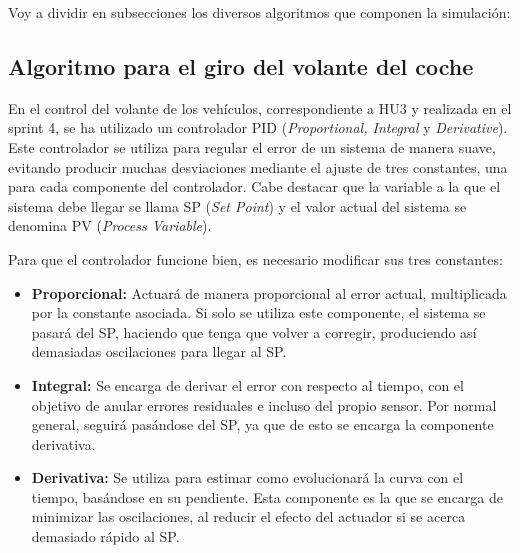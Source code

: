 Voy a dividir en subsecciones los diversos algoritmos que componen la simulación:

\subsection{Algoritmo para el giro del volante del coche}

En el control del volante de los vehículos, correspondiente a HU3 y realizada en el sprint 4, se ha utilizado un controlador PID (\textit{Proportional, Integral} y \textit{Derivative}). Este controlador se utiliza para regular el error de un sistema de manera suave, evitando producir muchas desviaciones mediante el ajuste de tres constantes, una para cada componente del controlador. Cabe destacar que la variable a la que el sistema debe llegar se llama SP (\textit{Set Point}) y el valor actual del sistema se denomina PV (\textit{Process Variable}). 

\bigskip

Para que el controlador funcione bien, es necesario modificar sus tres constantes: 

\begin{itemize}
    \item \textbf{Proporcional: }Actuará de manera proporcional al error actual, multiplicada por la constante asociada. Si solo se utiliza este componente, el sistema se pasará del SP, haciendo que tenga que volver a corregir, produciendo así demasiadas oscilaciones para llegar al SP. 

    \item \textbf{Integral: }Se encarga de derivar el error con respecto al tiempo, con el objetivo de anular errores residuales e incluso del propio sensor. Por normal general, seguirá pasándose del SP, ya que de esto se encarga la componente derivativa.

    \item \textbf{Derivativa: }Se utiliza para estimar como evolucionará la curva con el tiempo, basándose en su pendiente. Esta componente es la que se encarga de minimizar las oscilaciones, al reducir el efecto del actuador si se acerca demasiado rápido al SP.
\end{itemize}

\bigskip

